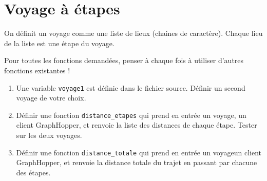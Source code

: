 \documentclass[11pt,a4paper]{article}
\begin{document}
\section{Voyage à étapes}
On définit un voyage comme une liste de lieux (chaines de caractère). Chaque lieu de la liste est une étape du voyage.

Pour toutes les fonctions demandées, penser à chaque fois à utiliser d'autres fonctions existantes !

\begin{enumerate}
    \item Une variable \verb+voyage1+ est définie dans le fichier source. Définir un second voyage de votre choix.
    \item Définir une fonction \verb+distance_etapes+ qui prend en entrée un voyage, un client GraphHopper, et renvoie la liste des distances de chaque étape. Tester sur les deux voyages.
    \item Définir une fonction \verb+distance_totale+ qui prend en entrée un voyageun client GraphHopper, et renvoie la distance totale du trajet en passant par chacune des étapes.
\end{enumerate}
\end{document}
